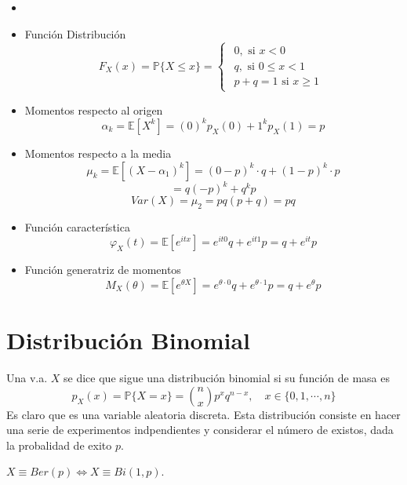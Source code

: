 \begin{prop}
  \begin{itemize}
    \item []
    \item Función Distribución
      \[ 
        F_{X}(x) = \mathbb{P} \{ X \leq x \} =
        \begin{cases}
          \begin{aligned}
            0, \text{ si } x < 0 \\
            q, \text{ si } 0 \leq x < 1 \\
            p + q = 1 \text{ si } x \geq 1
          \end{aligned}
        \end{cases} 
      \] 
    \item Momentos respecto al origen
      \[ 
        \alpha_{k} = \mathbb{E} [ X^{k} ] = (0)^{k} p_{X}(0) + 1^{k} p_{X}(1) = p 
      \] 
    \item Momentos respecto a la media
      \[ 
        \mu_{k} = \mathbb{E} [ (X - \alpha_{1})^{k} ] = (0 - p)^{k} \cdot q + (1 - p)^{k} \cdot p
      \] 
      \[ 
        = q (-p)^{k} + q^{k} p
      \] 
      \[ 
        Var (X) = \mu_{2} = pq(p + q) = pq
      \] 
    \item Función característica
      \[ 
        \varphi_{X}(t) = \mathbb{E} [ e^{itx} ] = e^{it0}q + e^{it1} p = q + e^{it} p
      \] 
    \item Función generatriz de momentos
      \[ 
        M_{X}(\theta) = \mathbb{E} [ e^{\theta X} ] = e^{\theta \cdot 0} q + e^{\theta \cdot 1} p = q + e^{\theta} p 
      \] 
  \end{itemize}
\end{prop}

\section{Distribución Binomial}

\begin{defn}
  Una v.a. $X$ se dice que sigue una distribución binomial si su función de masa es
  \[ 
    p_{X}(x) = \mathbb{P} \{ X = x \} = \binom{n}{x} p^{x} q^{n -x}, \quad x \in \{ 0, 1, \cdots, n \}
  \]
  Es claro que es una variable aleatoria discreta. Esta distribución consiste en hacer una serie de experimentos indpendientes y considerar el número de existos, dada la probalidad de exito $p$.
\end{defn}

\begin{obs}
  $X \equiv Ber(p) \Leftrightarrow X \equiv Bi(1, p)$.
\end{obs}

